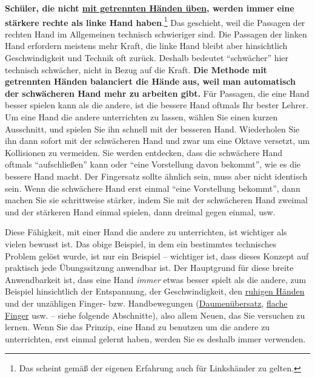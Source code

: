 \textbf{Schüler, die nicht \hyperref[c1ii7]{mit getrennten Händen üben}, werden immer eine stärkere rechte als linke Hand haben}.\footnote{Das scheint gemäß der eigenen Erfahrung auch für Linkshänder zu gelten.}
Das geschieht, weil die Passagen der rechten Hand im Allgemeinen technisch schwieriger sind.
Die Passagen der linken Hand erfordern meistens mehr Kraft, die linke Hand bleibt aber hinsichtlich Geschwindigkeit und Technik oft zurück.
Deshalb bedeutet \enquote{schwächer} hier technisch schwächer, nicht in Bezug auf die Kraft.
\textbf{Die Methode mit getrennten Händen balanciert die Hände aus, weil man automatisch der schwächeren Hand mehr zu arbeiten gibt.}
Für Passagen, die eine Hand besser spielen kann als die andere, ist die bessere Hand oftmals Ihr bester Lehrer.
Um eine Hand die andere unterrichten zu lassen, wählen Sie einen kurzen Ausschnitt, und spielen Sie ihn schnell mit der besseren Hand.
Wiederholen Sie ihn dann sofort mit der schwächeren Hand und zwar um eine Oktave versetzt, um Kollisionen zu vermeiden.
Sie werden entdecken, dass die schwächere Hand oftmals \enquote{aufschließen} kann oder \enquote{eine Vorstellung davon bekommt}, wie es die bessere Hand macht.
Der Fingersatz sollte ähnlich sein, muss aber nicht identisch sein.
Wenn die schwächere Hand erst einmal \enquote{eine Vorstellung bekommt}, dann machen Sie sie schrittweise stärker, indem Sie mit der schwächeren Hand zweimal und der stärkeren Hand einmal spielen, dann dreimal gegen einmal, usw.

Diese Fähigkeit, mit einer Hand die andere zu unterrichten, ist wichtiger als vielen bewusst ist.
Das obige Beispiel, in dem ein bestimmtes technisches Problem gelöst wurde, ist nur ein Beispiel -- wichtiger ist, dass dieses Konzept auf praktisch jede Übungssitzung anwendbar ist.
Der Hauptgrund für diese breite Anwendbarkeit ist, dass eine Hand \textit{immer} etwas besser spielt als die andere, zum Beispiel hinsichtlich der Entspannung, der Geschwindigkeit, den \hyperref[ruhig]{ruhigen Händen} und der unzähligen Finger- bzw. Handbewegungen (\hyperref[c1iii5a]{Daumenübersatz}, \hyperref[c1iii4b]{flache Finger} usw. -- siehe folgende Abschnitte), also allem Neuen, das Sie versuchen zu lernen.
Wenn Sie das Prinzip, eine Hand zu benutzen um die andere zu unterrichten, erst einmal gelernt haben, werden Sie es deshalb immer verwenden.



